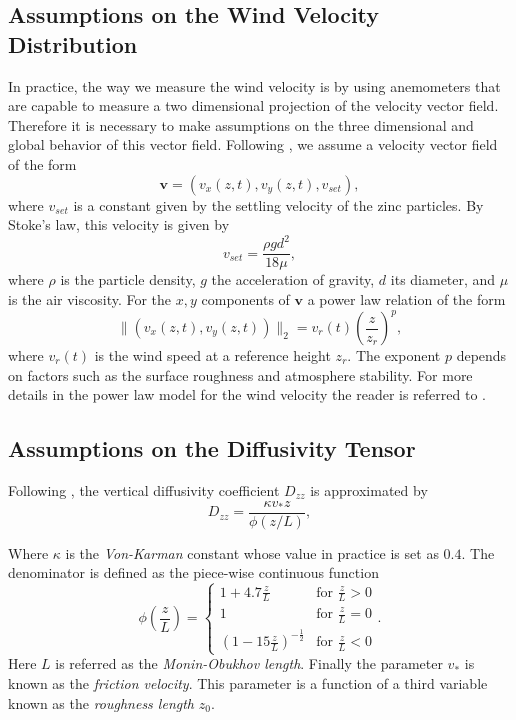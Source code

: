 \documentclass[12pt]{book}
\newcommand{\vv}{\textbf{v}}
\begin{document}
\subsection{Assumptions on the Wind Velocity Distribution}
In practice, the way we measure the wind velocity is by using anemometers that are capable to 
measure a two dimensional projection of the   velocity vector field.
Therefore
it is necessary to make assumptions on the three dimensional and global behavior of this vector field.
Following \cite{hosseini2016airborne}, we assume a velocity vector field of the form 
\begin{equation*}
\vv=(v_{x}(z,t),v_{y}(z,t),v_{set}),
\end{equation*}
where $v_{set}$ is a constant given by  the settling velocity of the zinc particles. By Stoke's law,
this velocity is given by
\begin{equation*}
v_{set}=\frac{\rho g d^{2}}{18\mu},
\end{equation*}
where $\rho$ is the particle density, $g$ the acceleration of gravity,  $d$ its diameter, and
$\mu$ is the air viscosity. For the $x,y$ components of $\vv$ a power law relation of the form
\begin{equation}\label{eqnPowerLaw}
\|(v_{x}(z,t),v_{y}(z,t))\|_{2}=v_{r}(t)\left(\frac{z}{z_{r}}\right)^{p},
\end{equation}
where $v_{r}(t)$  is the wind speed at a reference height $z_{r}$. The exponent $p$ depends on 
factors such as the surface roughness and atmosphere stability. For more details in the power
law model for the wind velocity the reader is referred to \cite{seinfeld1998atmospheric}.


\subsection{Assumptions on the Diffusivity Tensor}
Following \cite{monin1954basic},  the vertical diffusivity coefficient $D_{zz}$ is approximated by
\begin{equation}\label{eqnEddyVertical}
D_{zz}=\frac{\kappa v_{*} z}{\phi(z/L)},
\end{equation}

Where $\kappa$ is the \textit{Von-Karman} constant whose value in practice is set as $0.4$. The denominator
is defined as the piece-wise continuous function
\begin{equation*}
\phi\left(\frac{z}{L}\right)=\left\{
			\begin{array}{ll}				
				1+4.7\frac{z}{L} &\mbox{for }\frac{z}{L}>0 \\
				1 &\mbox{for }\frac{z}{L}=0\\
				(1-15\frac{z}{L})^{-\frac{1}{2}}&\mbox{for }\frac{z}{L}<0
			\end{array}.
		\right.
\end{equation*}
Here $L$ is referred as the \textit{Monin-Obukhov length}. Finally the parameter $v_{*}$ is known as 
the \textit{friction velocity}. This parameter is a  function of a third variable known as 
the \textit{roughness length} $z_{0}$. 
\end{document}
